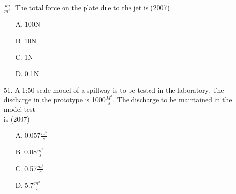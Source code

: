 \documentclass[journal]{IEEEtran}
\begin{document}
\begin{enumerate}
  $\frac{kg}{m^3}$. The total force on the plate due to the jet is  \hfill (2007)
  \begin{enumerate}
    \item [A.] 100N
    \item [B.] 10N 
    \item [C.] 1N 
    \item [D.] 0.1N 
  \end{enumerate}
  \item [51.] A 1:50 scale model of a spillway is to be tested in the laboratory. The discharge in
  the prototype is 1000$\frac{M^3}{s}$. The discharge to be maintained in the model test \\ is \hfill (2007) 
  \begin{enumerate}
    \item [A.] 0.057$\frac{m^3}{s}$ 
    \item [B.] 0.08$\frac{m^3}{s}$
    \item [C.] 0.57$\frac{m^3}{s}$ 
    \item [D.] 5.7$\frac{m^3}{s}$
  \end{enumerate}
\end{enumerate}
\end{document}
